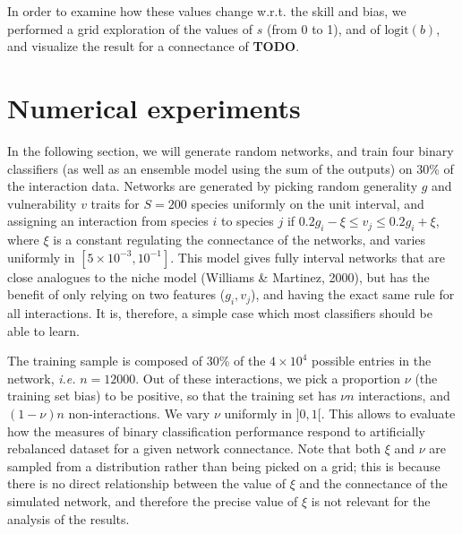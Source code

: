 \documentclass[11pt]{article}
\begin{document}
In order to examine how these values change w.r.t. the skill and bias,
we performed a grid exploration of the values of \(s\) (from 0 to 1),
and of \(\text{logit}(b)\), and visualize the result for a connectance
of \textbf{TODO}.

\hypertarget{numerical-experiments}{%
\section{Numerical experiments}\label{numerical-experiments}}

In the following section, we will generate random networks, and train
four binary classifiers (as well as an ensemble model using the sum of
the outputs) on 30\% of the interaction data. Networks are generated by
picking random generality \(g\) and vulnerability \(v\) traits for
\(S = 200\) species uniformly on the unit interval, and assigning an
interaction from species \(i\) to species \(j\) if
\(0.2g_i-\xi \le v_j \le 0.2g_i+\xi\), where \(\xi\) is a constant
regulating the connectance of the networks, and varies uniformly in
\([5\times 10^{-3}, 10^{-1}]\). This model gives fully interval networks
that are close analogues to the niche model (Williams \& Martinez,
2000), but has the benefit of only relying on two features
(\(g_i, v_j\)), and having the exact same rule for all interactions. It
is, therefore, a simple case which most classifiers should be able to
learn.

The training sample is composed of 30\% of the \(4\times 10^4\) possible
entries in the network, \emph{i.e.} \(n=12000\). Out of these
interactions, we pick a proportion \(\nu\) (the training set bias) to be
positive, so that the training set has \(\nu n\) interactions, and
\((1-\nu) n\) non-interactions. We vary \(\nu\) uniformly in \(]0,1[\).
This allows to evaluate how the measures of binary classification
performance respond to artificially rebalanced dataset for a given
network connectance. Note that both \(\xi\) and \(\nu\) are sampled from
a distribution rather than being picked on a grid; this is because there
is no direct relationship between the value of \(\xi\) and the
connectance of the simulated network, and therefore the precise value of
\(\xi\) is not relevant for the analysis of the results.
\end{document}
